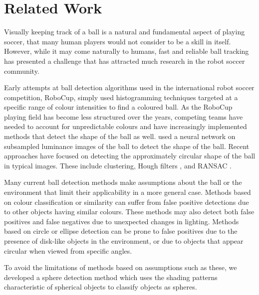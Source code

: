 \documentclass{sig-alternate-05-2015}
\newcommand{\citep}[1]{\cite{#1}}
\newcommand{\citet}[1]{\cite{#1}}
\begin{document}


	\printccsdesc


	\section{Related Work} {
	\label{sec:related_work}

		Visually keeping track of a ball is a natural and fundamental aspect of playing soccer, that many human players would not consider to be a skill in itself. However, while it may come naturally to humans, fast and reliable ball tracking has presented a challenge that has attracted much research in the robot soccer community.

		Early attempts at ball detection algorithms used in the international robot soccer competition, RoboCup, simply used histogramming techniques targeted at a specific range of colour intensities to find a coloured ball. As the RoboCup playing field has become less structured over the years, competing teams have needed to account for unpredictable colours and have increasingly implemented methods that detect the shape of the ball as well. \citet{schulz2007ball} used a neural network on subsampled luminance images of the ball to detect the shape of the ball. Recent approaches have focused on detecting the approximately circular shape of the ball in typical images. These include clustering, Hough filters \citep{li2013survey}, and RANSAC \citep{annable2013nubots}.

		Many current ball detection methods make assumptions about the ball or the environment that limit their applicability in a more general case. Methods based on colour classification or similarity can suffer from false positive detections due to other objects having similar colours. These methods may also detect both false positives and false negatives due to unexpected changes in lighting. Methods based on circle or ellipse detection can be prone to false positives due to the presence of disk-like objects in the environment, or due to objects that appear circular when viewed from specific angles.

		To avoid the limitations of methods based on assumptions such as these, we developed a sphere detection method which uses the shading patterns characteristic of spherical objects to classify objects as spheres.

}
\end{document}
